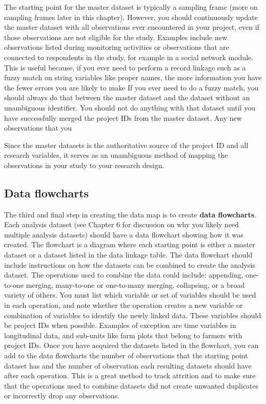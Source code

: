 The starting point for the master dataset is typically a sampling frame
(more on sampling frames later in this chapter).
However, you should continuously update the master dataset with
all observations ever encountered in your project,
even if those observations are not eligible for the study.
Examples include new observations listed during monitoring activities
or observations that are connected to respondents in the study,
for example in a social network module.
This is useful because,
if you ever need to perform a record linkage such as a fuzzy match
on string variables like proper names,
the more information you have the fewer errors you are likely to make
If you ever need to do a fuzzy match,
you should always do that between the master dataset
and the dataset without an unambiguous identifier.
You should not do anything with that dataset until
you have successfully merged
the project IDs from the master dataset.
Any new observations that you

Since the master datasets is the authoritative source
of the project ID and all research variables,
it serves as an unambiguous method of mapping
the observations in your study to your research design.

\subsection{Data flowcharts}

The third and final step in creating the data map is to create \textbf{data flowcharts}.
Each analysis dataset
(see Chapter 6 for discussion on why you likely need multiple analysis datasets)
should have a data flowchart showing how it was created.
The flowchart is a diagram
where each starting point is either a master dataset
or a dataset listed in the data linkage table.
The data flowchart should include instructions on how
the datasets can be combined to create the analysis dataset.
The operations used to combine the data could include:
appending, one-to-one merging,
many-to-one or one-to-many merging, collapsing, or a broad variety of others.
You must list which variable or set of variables
should be used in each operation,
and note whether the operation creates a new variable or combination of variables
to identify the newly linked data.
These variables should be project IDs when possible.
Examples of exception are time variables in longitudinal data,
and sub-units like farm plots that belong to farmers with project IDs.
Once you have acquired the datasets listed in the flowchart,
you can add to the data flowcharts the number of observations that
the starting point dataset has
and the number of observation each resulting datasets
should have after each operation.
This is a great method to track attrition and to make sure that
the operations used to combine datasets did not create unwanted duplicates
or incorrectly drop any observations.

